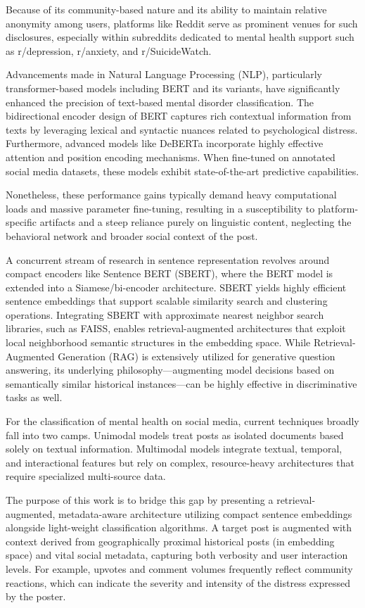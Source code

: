 \documentclass[11pt]{article}
\begin{document}
Because of its community-based nature and its ability to maintain relative anonymity among users, platforms like Reddit serve as prominent venues for such disclosures, especially within subreddits dedicated to mental health support such as r/depression, r/anxiety, and r/SuicideWatch.

Advancements made in Natural Language Processing (NLP), particularly transformer-based models including BERT and its variants, have significantly enhanced the precision of text-based mental disorder classification. The bidirectional encoder design of BERT captures rich contextual information from texts by leveraging lexical and syntactic nuances related to psychological distress. Furthermore, advanced models like DeBERTa incorporate highly effective attention and position encoding mechanisms. When fine-tuned on annotated social media datasets, these models exhibit state-of-the-art predictive capabilities.

Nonetheless, these performance gains typically demand heavy computational loads and massive parameter fine-tuning, resulting in a susceptibility to platform-specific artifacts and a steep reliance purely on linguistic content, neglecting the behavioral network and broader social context of the post.

A concurrent stream of research in sentence representation revolves around compact encoders like Sentence BERT (SBERT), where the BERT model is extended into a Siamese/bi-encoder architecture. SBERT yields highly efficient sentence embeddings that support scalable similarity search and clustering operations. Integrating SBERT with approximate nearest neighbor search libraries, such as FAISS, enables retrieval-augmented architectures that exploit local neighborhood semantic structures in the embedding space. While Retrieval-Augmented Generation (RAG) is extensively utilized for generative question answering, its underlying philosophy—augmenting model decisions based on semantically similar historical instances—can be highly effective in discriminative tasks as well.

For the classification of mental health on social media, current techniques broadly fall into two camps. Unimodal models treat posts as isolated documents based solely on textual information. Multimodal models integrate textual, temporal, and interactional features but rely on complex, resource-heavy architectures that require specialized multi-source data.

The purpose of this work is to bridge this gap by presenting a retrieval-augmented, metadata-aware architecture utilizing compact sentence embeddings alongside light-weight classification algorithms. A target post is augmented with context derived from geographically proximal historical posts (in embedding space) and vital social metadata, capturing both verbosity and user interaction levels. For example, upvotes and comment volumes frequently reflect community reactions, which can indicate the severity and intensity of the distress expressed by the poster.
\end{document}
